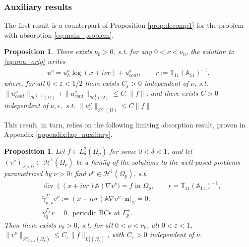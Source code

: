 \documentclass[report]{elsarticle}
\newtheorem{proposition}[theorem]{Proposition}
\numberwithin{theorem}{section}
\renewcommand{\vec}[1]{\mathbf{#1}}
\newcommand{\re}{\varepsilon}
\begin{document}
\subsubsection{Auxiliary results}
The first result is a counterpart of Proposition \ref{prop:decomp1} for the problem with absorption \eqref{eq:main_problem}.
\begin{proposition}
	\label{prop:aux}
	There exists $\nu_0>0$, s.t. for any $0<\nu<\nu_0$, the solution to \eqref{eq:unu_orig} writes
	\begin{align*}
		u^{\nu}=u^{\nu}_h\log\left(x+i\nu r\right)+u^{\nu}_{cont},\qquad r:=\mathbb{T}_{11}(\mathbb{A}_{11})^{-1},
	\end{align*}
	where, for all $0<\re<1/2$ there exists $C_{\re}>0$ independent of $\nu$, s.t.    $\|u^{\nu}_{cont}\|_{\mathcal{H}^{1-\re}(\Omega)}+ \|u^{\nu}_{cont}\|_{\mathcal{H}^{1}_{\re}(\Omega)}\leq C_{\re}\|f\|$, and there exists $C>0$ independent of $\nu, \re,$ s.t. $\|u^{\nu}_h\|_{\mathcal{H}^1(\Omega)}\leq C\|f\|$. 
\end{proposition}
This result, in turn, relies on the following limiting absorption result, proven in Appendix \ref{appendix:lap_auxiliary}. 
\begin{proposition}
	\label{prop:lap_reg}
	Let $f\in L^2_{\delta}(\Omega_p)$ for some $0<\delta<1$, and  let $(v^{\nu})_{\nu>0}\subset \mathcal{H}^1(\Omega_p)$ be a family of the solutions to the well-posed problems parametrized by $\nu>0$: find $v^{\nu}\in \mathcal{H}^1(\Omega_p)$, s.t.
	\begin{align*}
		&\operatorname{div}((x+i\nu r)\mathbb{A})\nabla v^{\nu})=f \text{ in }\Omega_p,\qquad r=\mathbb{T}_{11}(\mathbb{A}_{11})^{-1},\\
		&\widetilde{\gamma}_{n,\nu}^{\Sigma}v^{\nu}:=\left.(x+i\nu r)\mathbb{A}\nabla v^{\nu}\cdot \vec{n}\right|_{\Sigma}=0,\\
		&\gamma_0^{\Gamma_p}v=0, \text{ periodic BCs at }\Gamma^{\pm}_p.
	\end{align*}
	Then there exists $\nu_0>0$, s.t. for all $0<\nu<\nu_0$, all $0<\re<1$,  $\|v^{\nu}\|_{\mathcal{H}^1_{\delta+\re}(\Omega_p)}\leq C_{\re} \|f\|_{L^2_{\delta}(\Omega_p)}$, with $C_{\re}>0$ independent of $\nu$. 
\end{proposition}
\end{document}
